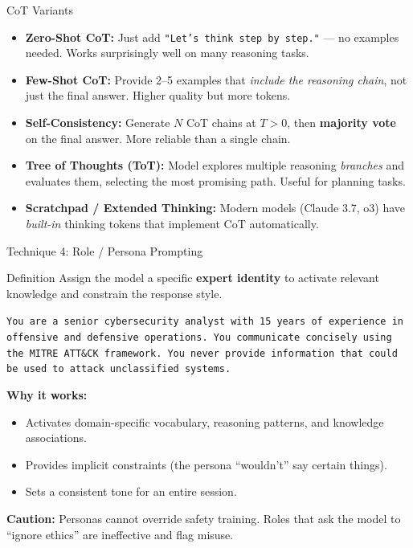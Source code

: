 \documentclass{beamer}
\begin{document}
\begin{frame}{CoT Variants}
    \begin{itemize}
        \item \textbf{Zero-Shot CoT:} Just add \texttt{"Let's think step by step."} --- no examples needed.
              Works surprisingly well on many reasoning tasks.
        \item \textbf{Few-Shot CoT:} Provide 2--5 examples that \emph{include the reasoning chain},
              not just the final answer. Higher quality but more tokens.
        \item \textbf{Self-Consistency:} Generate $N$ CoT chains at $T > 0$, then \textbf{majority vote}
              on the final answer. More reliable than a single chain.
        \item \textbf{Tree of Thoughts (ToT):} Model explores multiple reasoning \emph{branches} and
              evaluates them, selecting the most promising path. Useful for planning tasks.
        \item \textbf{Scratchpad / Extended Thinking:} Modern models (Claude 3.7, o3) have
              \emph{built-in} thinking tokens that implement CoT automatically.
    \end{itemize}
\end{frame}

\begin{frame}{Technique 4: Role / Persona Prompting}
    \begin{block}{Definition}
        Assign the model a specific \textbf{expert identity} to activate relevant knowledge and
        constrain the response style.
    \end{block}

    \vspace{0.2cm}
    \begin{tcolorbox}[colback=systembg, colframe=blue!50]
        \scriptsize
        \texttt{You are a senior cybersecurity analyst with 15 years of experience in
        offensive and defensive operations. You communicate concisely using the MITRE ATT\&CK
        framework. You never provide information that could be used to attack unclassified systems.}
    \end{tcolorbox}

    \vspace{0.2cm}
    \textbf{Why it works:}
    \begin{itemize}
        \item Activates domain-specific vocabulary, reasoning patterns, and knowledge associations.
        \item Provides implicit constraints (the persona ``wouldn't'' say certain things).
        \item Sets a consistent tone for an entire session.
    \end{itemize}

    \textbf{Caution:} Personas cannot override safety training. Roles that ask the model to
    ``ignore ethics'' are ineffective and flag misuse.
\end{frame}
\end{document}
